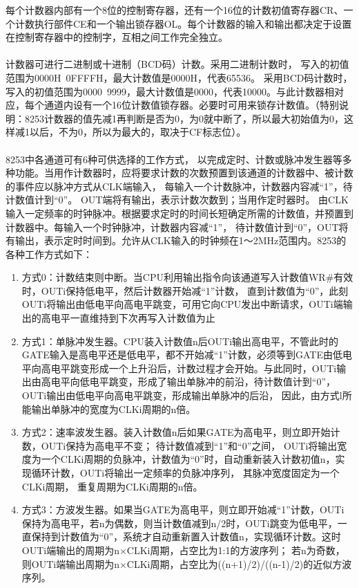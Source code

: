 \documentclass[12pt]{article}
\begin{document}
\begin{list}{•}{•}
每个计数器内部有一个8位的控制寄存器，还有一个16位的计数初值寄存器CR、一个计数执行部件CE和一个输出锁存器OL。每个计数器的输入和输出都决定于设置在控制寄存器中的控制字，互相之间工作完全独立。
\\\\
计数器可进行二进制或十进制（BCD码）计数。采用二进制计数时， 写入的初值范围为0000H~0FFFFH，最大计数值是0000H，代表65536。 采用BCD码计数时，写入的初值范围为0000~9999，最大计数值是0000，代表10000。与此计数器相对应，每个通道内设有一个16位计数值锁存器。必要时可用来锁存计数值。（特别说明：8253计数器的值先减1再判断是否为0，为0就中断了，所以最大初始值为0，这样减1以后，不为0，所以为最大的，取决于CF标志位）。
\\\\
8253中各通道可有6种可供选择的工作方式， 以完成定时、计数或脉冲发生器等多种功能。当用作计数器时，应将要求计数的次数预置到该通道的计数器中、被计数的事件应以脉冲方式从CLK端输入， 每输入一个计数脉冲，计数器内容减“1”，待计数值计到“0”。 OUT端将有输出，表示计数次数到；当用作定时器时。 由CLK输入一定频率的时钟脉冲。根据要求定时的时间长短确定所需的计数值，并预置到计数器中。每输入一个时钟脉冲，计数器内容减“1”， 待计数值计到“0”，OUT将有输出，表示定时时间到。允许从CLK输入的时钟频在1～2MHz范围内。8253的各种工作方式如下：
\begin{enumerate}
\item 方式0：计数结束则中断。当CPU利用输出指令向该通道写入计数值WR\#有效时，OUTi保持低电平，然后计数器开始减“1”计数， 直到计数值为“0”，此刻OUTi将输出由低电平向高电平跳变，可用它向CPU发出中断请求，OUTi端输出的高电平一直维持到下次再写入计数值为止
\item 方式1：单脉冲发生器。CPU装入计数值n后OUTi输出高电平，不管此时的GATE输入是高电平还是低电平，都不开始减“1”计数，必须等到GATE由低电平向高电平跳变形成一个上升沿后，计数过程才会开始。与此同时，OUTi输出由高电平向低电平跳变，形成了输出单脉冲的前沿，待计数值计到“0”， OUTi输出由低电平向高电平跳变，形成输出单脉冲的后沿， 因此，由方式l所能输出单脉冲的宽度为CLKi周期的n倍。
\item 方式2：速率波发生器。装入计数值n后如果GATE为高电平，则立即开始计数，OUTi保持为高电平不变； 待计数值减到“1”和“0”之间， OUTi将输出宽度为一个CLKi周期的负脉冲，计数值为“0”时，自动重新装入计数初值n，实现循环计数，OUTi将输出一定频率的负脉冲序列， 其脉冲宽度固定为一个CLKi周期， 重复周期为CLKi周期的n倍。
\item 方式3：方波发生器。如果当GATE为高电平，则立即开始减“1”计数，OUTi保持为高电平，若n为偶数，则当计数值减到n/2时，OUTi跳变为低电平，一直保持到计数值为“0”，系统才自动重新置入计数值n，实现循环计数。这时OUTi端输出的周期为n×CLKi周期，占空比为1:1的方波序列； 若n为奇数， 则OUTi端输出周期为n×CLKi周期，占空比为((n+1)/2)/((n-1)/2)的近似方波序列。

\end{enumerate}
\end{list}
\end{document}
